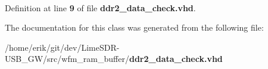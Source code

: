 \paragraph[{std\+\_\+logic\+\_\+1164}]{\hspace{0.3cm}{\ttfamily [Package]}}\label{classddr2__data__check_acd03516902501cd1c7296a98e22c6fcb}


Definition at line {\bf 9} of file {\bf ddr2\+\_\+data\+\_\+check.\+vhd}.



The documentation for this class was generated from the following file\+:\begin{DoxyCompactItemize}
\item 
/home/erik/git/dev/\+Lime\+S\+D\+R-\/\+U\+S\+B\+\_\+\+G\+W/src/wfm\+\_\+ram\+\_\+buffer/{\bf ddr2\+\_\+data\+\_\+check.\+vhd}\end{DoxyCompactItemize}

